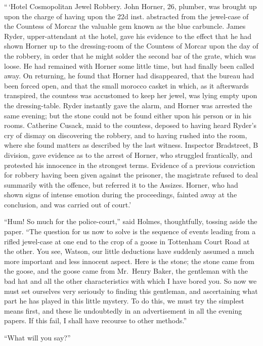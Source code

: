 “\,‘Hotel Cosmopolitan Jewel Robbery. John Horner, 26,
plumber, was brought up upon the charge of having upon the
22d inst. abstracted from the jewel-case of the Countess of
Morcar the valuable gem known as the blue carbuncle. James
Ryder, upper-attendant at the hotel, gave his evidence to the
effect that he had shown Horner up to the dressing-room of
the Countess of Morcar upon the day of the robbery, in order
that he might solder the second bar of the grate, which was
loose. He had remained with Horner some little time, but
had finally been called away. On returning, he found that
Horner had disappeared, that the bureau had been forced
open, and that the small morocco casket in which, as it afterwards
transpired, the countess was accustomed to keep her
jewel, was lying empty upon the dressing-table. Ryder instantly
gave the alarm, and Horner was arrested the same
evening; but the stone could not be found either upon his
person or in his rooms. Catherine Cusack, maid to the
countess, deposed to having heard Ryder’s cry of dismay on
discovering the robbery, and to having rushed into the room,
where she found matters as described by the last witness.
Inspector Bradstreet, B division, gave evidence as to the arrest
of Horner, who struggled frantically, and protested his
innocence in the strongest terms. Evidence of a previous
conviction for robbery having been given against the prisoner,
the magistrate refused to deal summarily with the offence, but
referred it to the Assizes. Horner, who had shown signs of
intense emotion during the proceedings, fainted away at the
conclusion, and was carried out of court.’

“Hum! So much for the police-court,” said Holmes,
thou\-ghtfully, tossing aside the paper. “The question for us
now to solve is the sequence of events leading from a rifled
jewel-case at one end to the crop of a goose in Tottenham
Court Road at the other. You see, Watson, our little deductions
have suddenly assumed a much more important and less
innocent aspect. Here is the stone; the stone came from the
goose, and the goose came from Mr.~Henry Baker, the gentleman
with the bad hat and all the other characteristics with
which I have bored you. So now we must set ourselves very
seriously to finding this gentleman, and ascertaining what part
he has played in this little mystery. To do this, we must try
the simplest means first, and these lie undoubtedly in an
advertisement in all the evening papers. If this fail, I shall have
recourse to other methods.”

“What will you say?”

